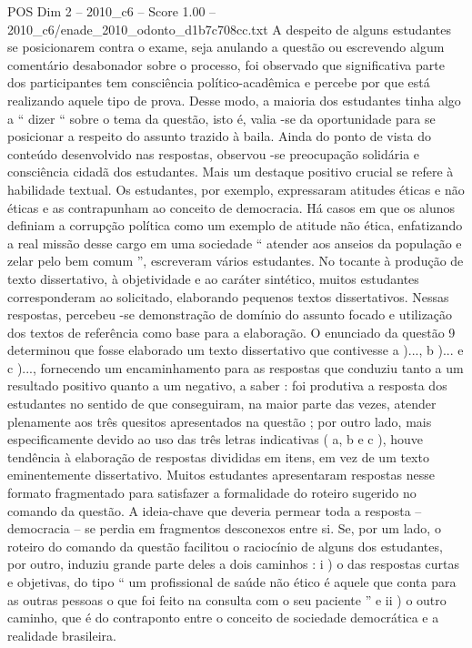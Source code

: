 \begin{textsample}{POS Dim 2 – 2010\_c6 – Score 1.00 – 2010\_c6/enade\_2010\_odonto\_d1b7c708cc.txt}
A despeito de alguns estudantes se posicionarem contra o exame, seja anulando a questão ou escrevendo algum comentário desabonador sobre o processo, foi observado que significativa parte dos participantes tem consciência político-acadêmica e percebe por que está realizando aquele tipo de prova.
Desse modo, a maioria dos estudantes tinha algo a “ dizer “ sobre o tema da questão, isto é, valia -se da oportunidade para se posicionar a respeito do assunto trazido à baila.
Ainda do ponto de vista do conteúdo desenvolvido nas respostas, observou -se preocupação solidária e consciência cidadã dos estudantes.
Mais um destaque positivo crucial se refere à habilidade textual.
Os estudantes, por exemplo, expressaram atitudes éticas e não éticas e as contrapunham ao conceito de democracia.
Há casos em que os alunos definiam a corrupção política como um exemplo de atitude não ética, enfatizando a real missão desse cargo em uma sociedade “ atender aos anseios da população e zelar pelo bem comum ”, escreveram vários estudantes.
No tocante à produção de texto dissertativo, à objetividade e ao caráter sintético, muitos estudantes corresponderam ao solicitado, elaborando pequenos textos dissertativos.
Nessas respostas, percebeu -se demonstração de domínio do assunto focado e utilização dos textos de referência como base para a elaboração.
O enunciado da questão 9 determinou que fosse elaborado um texto dissertativo que contivesse a )..., b )... e c )..., fornecendo um encaminhamento para as respostas que conduziu tanto a um resultado positivo quanto a um negativo, a saber : foi produtiva a resposta dos estudantes no sentido de que conseguiram, na maior parte das vezes, atender plenamente aos três quesitos apresentados na questão ; por outro lado, mais especificamente devido ao uso das três letras indicativas ( a, b e c ), houve tendência à elaboração de respostas divididas em itens, em vez de um texto eminentemente dissertativo.
Muitos estudantes apresentaram respostas nesse formato fragmentado para satisfazer a formalidade do roteiro sugerido no comando da questão.
A ideia-chave que deveria permear toda a resposta – democracia – se perdia em fragmentos desconexos entre si.
Se, por um lado, o roteiro do comando da questão facilitou o raciocínio de alguns dos estudantes, por outro, induziu grande parte deles a dois caminhos : i ) o das respostas curtas e objetivas, do tipo “ um profissional de saúde não ético é aquele que conta para as outras pessoas o que foi feito na consulta com o seu paciente ” e ii ) o outro caminho, que é do contraponto entre o conceito de sociedade democrática e a realidade brasileira.

\end{textsample}
